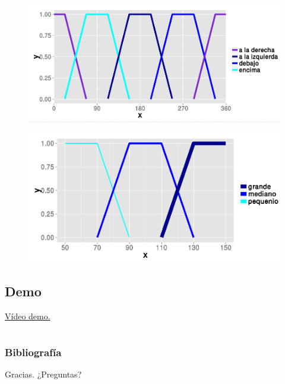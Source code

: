 \documentclass{beamer}
\begin{document}
	\begin{frame}
		\begin{figure}
			\includegraphics[width=1\textwidth]{img/partitionRelPos.png}			
		\end{figure}
	\end{frame}
	
	\begin{frame}
		\begin{figure}
			\includegraphics[width=1\textwidth]{img/partitionTam.png}			
		\end{figure}
	\end{frame}
	
	\subsection{Demo}
	
	\begin{frame}
		\begin{center}
			\href{https://www.youtube.com/watch?v=sfQNCcHsYu8}{Vídeo demo.}
		\end{center}
	\end{frame}
	
	\section*{}
	
	\begin{frame}[plain]
		\frametitle{Bibliografía}
		\nocite{*}
		
		
	\end{frame}
	
	\begin{frame}[plain]
		\begin{center}
			Gracias. ¿Preguntas?
		\end{center}
	\end{frame}
		
		
	
	
	
	
\end{document}
